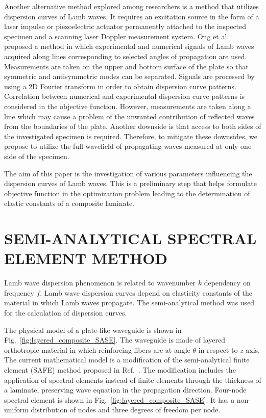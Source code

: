 \documentclass[]{spie}  %
\begin{document}
Another alternative method explored among researchers is a method that utilizes dispersion curves of Lamb waves.
It requires an excitation source in the form of a laser impulse or piezoelectric actuator permanently attached to the inspected specimen and a scanning laser Doppler measurement system.
Ong et al.~\cite{Ong2016} proposed a method in which experimental and numerical signals of Lamb waves acquired along lines corresponding to selected angles of propagation are used. 
Measurements are taken on the upper and bottom surface of the plate so that symmetric and antisymmetric modes can be separated.
Signals are processed by using a 2D Fourier transform in order to obtain dispersion curve patterns. 
Correlation between numerical and experimental dispersion curve patterns is considered in the objective function.
However, measurements are taken along a line which may cause a problem of the unwanted contribution of reflected waves from the boundaries of the plate.
Another downside is that access to both sides of the investigated specimen is required.
Therefore, to mitigate these downsides, we propose to utilize the full wavefield of propagating waves measured at only one side of the specimen.

The aim of this paper is the investigation of various parameters influencing the dispersion curves of Lamb waves.
This is a preliminary step that helps formulate objective function in the optimization problem leading to the determination of elastic constants of a composite laminate.


\section{SEMI-ANALYTICAL SPECTRAL ELEMENT METHOD}
\label{sec:sase}
Lamb wave dispersion phenomenon is related to wavenumber  \(k\) dependency on frequency \(f\). 
Lamb wave dispersion curves depend on elasticity constants of the material in which Lamb waves propagate.
The semi-analytical method was used for the calculation of dispersion curves.

The physical model of a plate-like waveguide is shown in Fig.~\ref{fig:layered_composite_SASE}.  
The waveguide is made of layered orthotropic material in which reinforcing fibers are at angle \(\theta\) in respect to \(z\) axis. 
The current mathematical model is a modification of the semi-analytical finite element (SAFE) method proposed in Ref.~. 
The modification includes the application of spectral elements instead of finite elements through the thickness of a laminate, preserving wave equation in the propagation direction. 
Four-node spectral element is shown in Fig.~\ref{fig:layered_composite_SASE}. 
It has a non-uniform distribution of nodes and three degrees of freedom per node.
\end{document}
